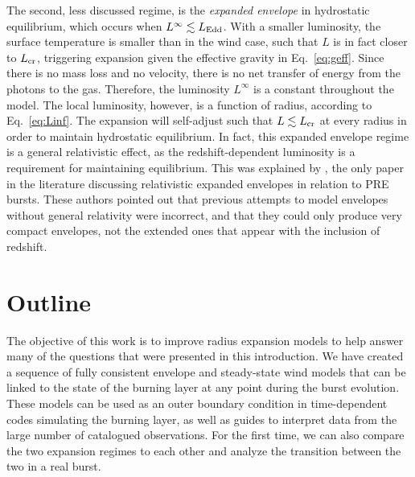 \documentclass[../main.tex]{subfiles}
\begin{document}
The second, less discussed regime, is the \textit{expanded envelope} in hydrostatic equilibrium, which occurs when $L^\infty \lesssim L_\text{Edd}$. With a smaller luminosity, the surface temperature is smaller than in the wind case, such that $L$ is in fact closer to $L_\text{cr}$, triggering expansion given the effective gravity in Eq.~\eqref{eq:geff}. Since there is no mass loss and no velocity, there is no net transfer of energy from the photons to the gas. Therefore, the luminosity $L^\infty$ is a constant throughout the model. The local luminosity, however, is a function of radius, according to Eq.~\eqref{eq:Linf}. The expansion will self-adjust such that $L\lesssim L_\text{cr}$ at every radius in order to maintain hydrostatic equilibrium. In fact, this expanded envelope regime is a general relativistic effect, as the redshift-dependent luminosity is a requirement for maintaining equilibrium. This was explained by \citet{Paczynski1986a}, the only paper in the literature discussing relativistic expanded envelopes in relation to PRE bursts. These authors pointed out that previous attempts to model envelopes without general relativity were incorrect, and that they could only produce very compact envelopes, not the extended ones that appear with the inclusion of redshift.

\section{Outline}\label{section:outline}


The objective of this work is to improve radius expansion models to help answer many of the questions that were presented in this introduction. We have created a sequence of fully consistent envelope and steady-state wind models that can be linked to the state of the burning layer at any point during the burst evolution. These models can be used as an outer boundary condition in time-dependent codes simulating the burning layer, as well as guides to interpret data from the large number of catalogued observations. For the first time, we can also compare the two expansion regimes to each other and analyze the transition between the two in a real burst. 

\end{document}
